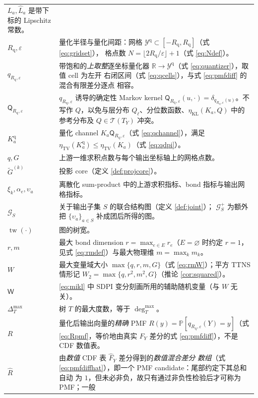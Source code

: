 \documentclass[a4paper,11pt]{article}
\theoremstyle{definition}
\newcommand{\R}{\mathbb R}
\newcommand{\Prob}{\mathbb P}
\newcommand{\1}{\mathbf 1}
\newcommand{\TV}{\mathrm{TV}}
\newcommand{\KL}{\mathrm{KL}}
\newcommand{\tw}{\operatorname{tw}}
\newcommand{\Gcal}{\mathcal G}
\newcommand{\calT}{\mathcal T}
\newcommand{\Rq}{R_{\mathrm{q}}}
\newcommand{\Qq}{\mathsf Q_{\Rq,\varepsilon}}
\begin{document}
\begin{longtable}{>{\raggedright\arraybackslash}p{}
                  >{\raggedright\arraybackslash}p{}}
$L_a,\widehat L_a$ 是带下标的 Lipschitz 常数。\\
$\Rq,\varepsilon$ & 量化半径与量化间距：网格
$\mathcal Y^{\mathrm{q}}\subset[-\Rq,\Rq]$（式 \eqref{eq:gridset}），
格点数 $N=\lfloor2\Rq/\varepsilon\rfloor+1$（式 \eqref{eq:Ndef}）。\\
$q_{\Rq,\varepsilon}$ & 带饱和的\emph{上取整}逐坐标量化器
$\R\to\mathcal Y^{\mathrm{q}}$（式 \eqref{eq:quantizer}），取值 cell 为左开
右闭区间（式 \eqref{eq:qcells}），与式 \eqref{eq:pmfdiff} 的混合有限差分逐点
相容。\\
$\Qq$ & $q_{\Rq,\varepsilon}$ 诱导的确定性 Markov kernel
$\Qq(u,\cdot)=\delta_{q_{\Rq,\varepsilon}(u)}$。不写作 $Q$，以免与层分布
$Q_\ell$、分位数函数、$\eta_{\KL}(K_a,Q)$ 中的参考分布及
$Q\in\calT(T_Y)$ 冲突。\\
$K_a^{\mathrm{q}}$ & 量化 channel $K_a\Qq$（式 \eqref{eq:qchannel}），满足
$\eta_{\TV}(K_a^{\mathrm{q}})\le\eta_{\TV}(K_a)$（式 \eqref{eq:qdpi}）。\\
$q,G$ & 上游一维求积点数与每个输出坐标轴上的网格点数。\\
$\widetilde G^{(k)}$ & 投影 core（定义 \ref{def:projcore}）。\\
$\xi_k,\alpha_e,\upsilon_a$ & 离散化 sum-product 中的上游求积指标、bond
指标与输出网格指标。\\
$\Gcal_S$ & 关于输出子集 $S$ 的联合结构图（定义 \ref{def:joint}）；
$\Gcal_S^{+}$ 为额外把 $\{\upsilon_a\}_{a\in S}$ 补成团后所得的图。\\
$\tw(\cdot)$ & 图的树宽。\\
$r,m$ & 最大 bond dimension $r=\max_{e\in E}r_e$（$E=\varnothing$ 时约定
$r=1$，见式 \eqref{eq:rmdef}）与最大物理维 $m=\max_k m_k$。\\
$W$ & 最大变量域大小 $\max\{q,r,m,G\}$（式 \eqref{eq:rmW}）；平方 TTNS
情形记 $W_2=\max\{q,r^2,m^2,G\}$（推论 \ref{cor:squared}）。\\
$\mathsf W$ & \eqref{eq:mikl} 中 SDPI 变分刻画所用的辅助随机变量（与
$W$ 无关）。\\
$\Delta_T^{\max}$ & 树 $T$ 的最大度数，等于 $\deg_T^{\max}$。\\
$R$ & 量化后输出向量的\emph{精确} PMF
$R(y)=\Prob[q_{\Rq,\varepsilon}(Y)=y]$（式 \eqref{eq:Rpmf}，等价地由真实
$F_Y$ 差分的式 \eqref{eq:pmfdiff}），不是 CDF 数值表。\\
$\widehat R$ & 由\emph{数值} CDF 表 $\widehat F_Y$ 差分得到的\emph{数值混合差分
数组}（式 \eqref{eq:pmfdiffhat}），即一个 PMF candidate：尾部约定下其总和自动
为 $1$，但未必非负，故只有通过非负性检验后才可称为 PMF；一般

\end{longtable}
\end{document}
